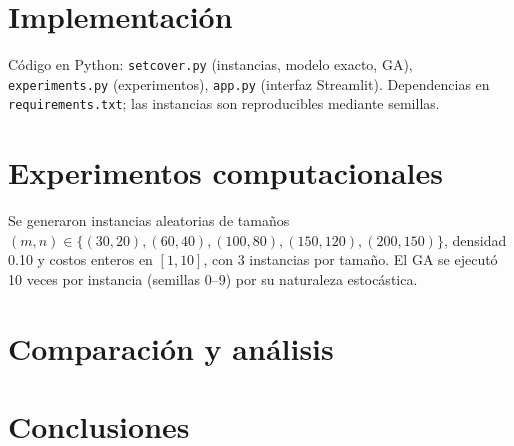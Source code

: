 \documentclass[11pt,a4paper]{article}
\begin{document}
\section{Implementaci\'on}
C\'odigo en Python: \texttt{setcover.py} (instancias, modelo exacto, GA), \texttt{experiments.py}
(experimentos), \texttt{app.py} (interfaz Streamlit). Dependencias en \texttt{requirements.txt};
las instancias son reproducibles mediante semillas. %

\section{Experimentos computacionales}
Se generaron instancias aleatorias de tama\~nos $(m,n)\in\{(30,20),(60,40),(100,80),(150,120),(200,150)\}$,
densidad 0.10 y costos enteros en $[1,10]$, con 3 instancias por tama\~no. El GA se ejecut\'o 10 veces
por instancia (semillas 0--9) por su naturaleza estoc\'astica. %

\begin{table}[H]
\centering\small

\caption{Promedios por tama\~no. El gap es $100\,(z_{GA}-z^*)/z^*$; ``\'Optimos'' cuenta las instancias donde el mejor de las 10 corridas alcanz\'o $z^*$.}
\label{tab:res}
\end{table}

\section{Comparaci\'on y an\'alisis}

\section{Conclusiones}



\end{document}
